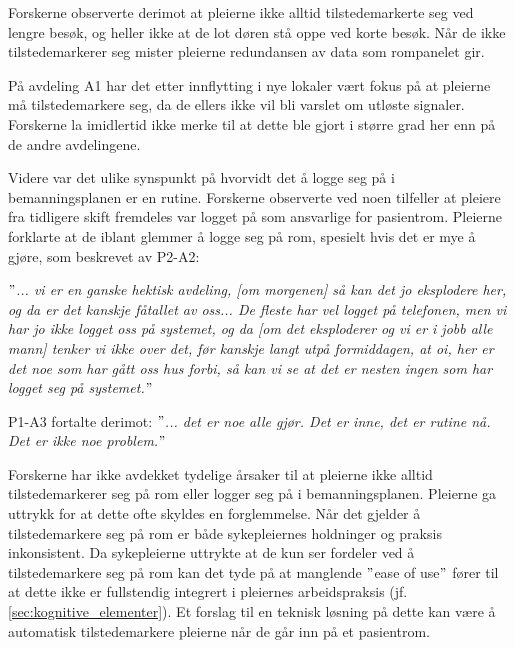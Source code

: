 \noindent
Forskerne observerte derimot at pleierne ikke alltid tilstedemarkerte seg ved lengre besøk, og heller ikke at de lot døren stå oppe ved korte besøk. Når de ikke tilstedemarkerer seg mister pleierne redundansen av data som rompanelet gir. 

\noindent
På avdeling A1 har det etter innflytting i nye lokaler vært fokus på at pleierne må tilstedemarkere seg, da de ellers ikke vil bli varslet om utløste signaler. Forskerne la imidlertid ikke merke til at dette ble gjort i større grad her enn på de andre avdelingene. 

\noindent
Videre var det ulike synspunkt på hvorvidt det å logge seg på i bemanningsplanen er en rutine. Forskerne observerte ved noen tilfeller at pleiere fra tidligere skift fremdeles var logget på som ansvarlige for pasientrom. Pleierne forklarte at de iblant glemmer å logge seg på rom, spesielt hvis det er mye å gjøre, som beskrevet av P2-A2:

\noindent
\textit{$"$... vi er en ganske hektisk avdeling, [om morgenen] så kan det jo eksplodere her, og da er det kanskje fåtallet av oss... De fleste har vel logget på telefonen, men vi har jo ikke logget oss på systemet, og da [om det eksploderer og vi er i jobb alle mann] tenker vi ikke over det, før kanskje langt utpå formiddagen, at oi, her er det noe som har gått oss hus forbi, så kan vi se at det er nesten ingen som har logget seg på systemet.$"$}

\noindent
P1-A3 fortalte derimot: \textit{$"$... det er noe alle gjør. Det er inne, det er rutine nå. Det er ikke noe problem.$"$} 

\noindent
Forskerne har ikke avdekket tydelige årsaker til at pleierne ikke alltid tilstedemarkerer seg på rom eller logger seg på i bemanningsplanen. Pleierne ga uttrykk for at dette ofte skyldes en forglemmelse. Når det gjelder å tilstedemarkere seg på rom er både sykepleiernes holdninger og praksis inkonsistent. Da sykepleierne uttrykte at de kun ser fordeler ved å tilstedemarkere seg på rom kan det tyde på at manglende $"$ease of use$"$ fører til at dette ikke er fullstendig integrert i pleiernes arbeidspraksis (jf. \ref{sec:kognitive_elementer}). Et forslag til en teknisk løsning på dette kan være å automatisk tilstedemarkere pleierne når de går inn på et pasientrom. 

